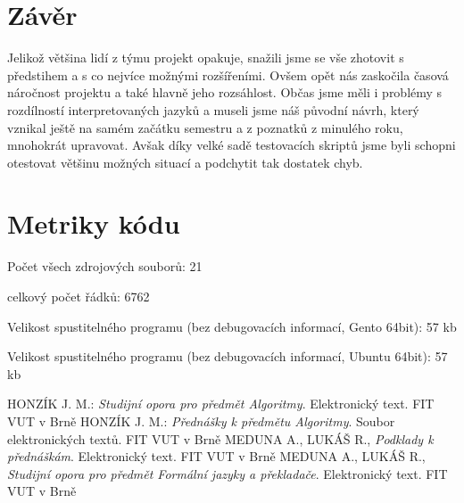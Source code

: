 \documentclass[12pt,a4paper,titlepage,final]{article}
\begin{document}
\section{Závěr} \label{zaver}
Jelikož většina lidí z týmu projekt opakuje, snažili jsme se vše zhotovit s předstihem a s co nejvíce možnými rozšířeními. Ovšem opět nás zaskočila časová náročnost projektu a také hlavně jeho rozsáhlost. Občas jsme měli i problémy s rozdílností interpretovaných jazyků a museli jsme náš původní návrh, který vznikal ještě na samém začátku semestru a z poznatků z minulého roku, mnohokrát upravovat. Avšak díky velké sadě testovacích skriptů jsme byli schopni otestovat většinu možných situací a podchytit tak dostatek chyb.

\appendix

\section{Metriky kódu} \label{metriky}
Počet všech zdrojových souborů: 21

celkový počet řádků: 6762

Velikost spustitelného programu (bez debugovacích informací, Gento 64bit): 57 kb

Velikost spustitelného programu (bez debugovacích informací, Ubuntu 64bit): 57 kb


\begin{thebibliography}{1}

HONZÍK J. M.: \emph{Studijní opora pro předmět Algoritmy}. Elektronický text. FIT VUT v Brně
HONZÍK J. M.: \emph{Přednášky k předmětu Algoritmy}. Soubor elektronických textů. FIT VUT v Brně
MEDUNA A., LUKÁŠ R., \emph{Podklady k přednáškám}. Elektronický text. FIT VUT v Brně
MEDUNA A., LUKÁŠ R., \emph{Studijní opora pro předmět Formální jazyky a překladače}. Elektronický text. FIT VUT v Brně


\end{thebibliography}
\appendix
\end{document}

